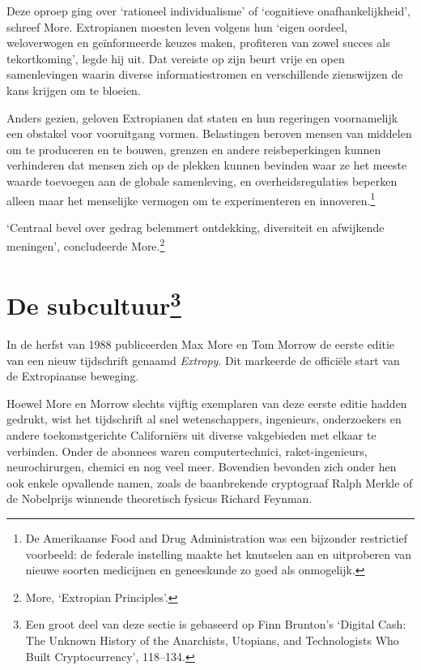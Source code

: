 \documentclass[
  a5paper,
  smalldemyvopaper,11pt,twoside,onecolumn,openright,extrafontsizes]{memoir}
\begin{document}
Deze oproep ging over `rationeel individualisme' of `cognitieve
onafhankelijkheid', schreef More. Extropianen moesten leven volgens hun
`eigen oordeel, weloverwogen en geïnformeerde keuzes maken, profiteren
van zowel succes als tekortkoming', legde hij uit. Dat vereiste op zijn
beurt vrije en open samenlevingen waarin diverse informatiestromen en
verschillende zienswijzen de kans krijgen om te bloeien.

Anders gezien, geloven Extropianen dat staten en hun regeringen
voornamelijk een obstakel voor vooruitgang vormen. Belastingen beroven
mensen van middelen om te produceren en te bouwen, grenzen en andere
reisbeperkingen kunnen verhinderen dat mensen zich op de plekken kunnen
bevinden waar ze het meeste waarde toevoegen aan de globale samenleving,
en overheidsregulaties beperken alleen maar het menselijke vermogen om
te experimenteren en innoveren.\footnote{De Amerikaanse Food and Drug
  Administration was een bijzonder restrictief voorbeeld: de federale
  instelling maakte het knutselen aan en uitproberen van nieuwe soorten
  medicijnen en geneeskunde zo goed als onmogelijk.}

`Centraal bevel over gedrag belemmert ontdekking, diversiteit en
afwijkende meningen', concludeerde More.\footnote{More, `Extropian
  Principles'.}

\section[De subcultuur]{\texorpdfstring{De
subcultuur\footnote{Een groot deel van deze sectie is gebaseerd op Finn
  Brunton's `Digital Cash: The Unknown History of the Anarchists,
  Utopians, and Technologists Who Built Cryptocurrency', 118--134.}}{De subcultuur}}\label{de-subcultuur131}

In de herfst van 1988 publiceerden Max More en Tom Morrow de eerste
editie van een nieuw tijdschrift genaamd \emph{Extropy}. Dit markeerde
de officiële start van de Extropiaanse beweging.

Hoewel More en Morrow slechts vijftig exemplaren van deze eerste editie
hadden gedrukt, wist het tijdschrift al snel wetenschappers, ingenieurs,
onderzoekers en andere toekomstgerichte Californiërs uit diverse
vakgebieden met elkaar te verbinden. Onder de abonnees waren
computertechnici, raket-ingenieurs, neurochirurgen, chemici en nog veel
meer. Bovendien bevonden zich onder hen ook enkele opvallende namen,
zoals de baanbrekende cryptograaf Ralph Merkle of de Nobelprijs winnende
theoretisch fysicus Richard Feynman.
\end{document}
